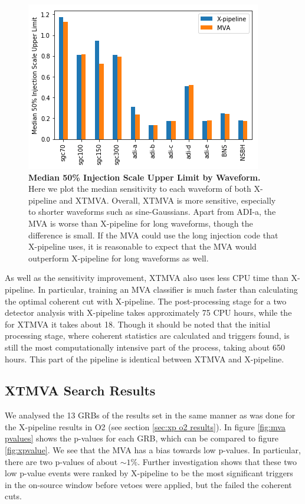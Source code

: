 \documentclass[11pt]{cuthesis}
\newcommand{\xp}{X-pipeline }
\newcommand{\xpfs}{X-pipeline. }
\begin{document}
\begin{figure} %
\begin{center}
\includegraphics[width=1.0\linewidth]{median_50pc_injscale.png}
\end{center}
\caption{\textbf{Median 50\% Injection Scale Upper Limit by Waveform.} Here we plot the median sensitivity to each waveform of both \xp and XTMVA. Overall, XTMVA is more sensitive, especially to shorter waveforms such as sine-Gaussians. Apart from ADI-a, the MVA is worse than \xp for long waveforms, though the difference is small. If the MVA could use the long injection code that \xp uses, it is reasonable to expect that the MVA would outperform \xp for long waveforms as well. }
\label{fig:median injscale}
\end{figure}

As well as the sensitivity improvement, XTMVA also uses less CPU time than \xpfs In particular, training an MVA classifier is much faster than calculating the optimal coherent cut with \xpfs The post-processing stage for a two detector analysis with \xp takes approximately 75 CPU hours, while the for XTMVA it takes about 18. Though it should be noted that the initial processing stage, where coherent statistics are calculated and triggers found, is still the most computationally intensive part of the process, taking about 650 hours. This part of the pipeline is identical between XTMVA and \xpfs

\subsection{XTMVA Search Results} \label{sec:mva results}
We analysed the 13 GRBs of the results set in the same manner as was done for the \xp results in O2 (see section \ref{sec:xp o2 results}). In figure \ref{fig:mva pvalues} shows the p-values for each GRB, which can be compared to figure \ref{fig:xpvalue}. We see that the MVA has a bias towards low p-values. In particular, there are two p-values of about $\sim1\%$. Further investigation shows that these two low p-value events were ranked by \xp to be the most significant triggers in the on-source window before vetoes were applied, but the failed the coherent cuts. 
\end{document}
